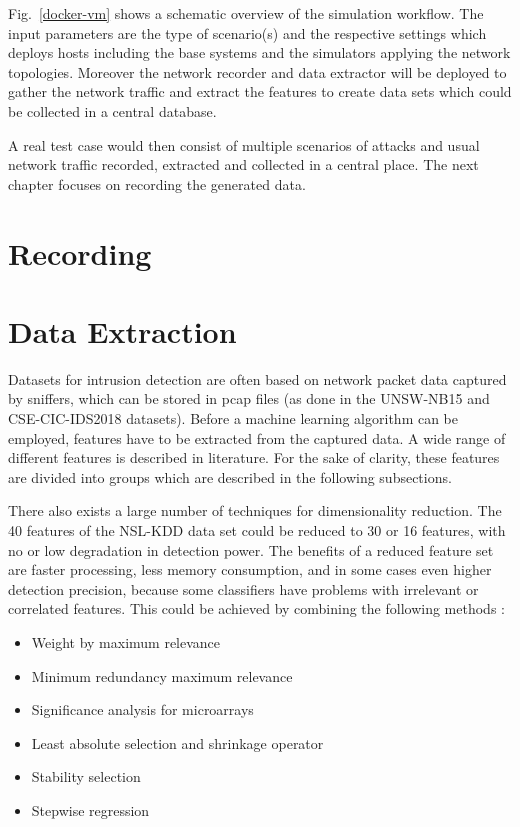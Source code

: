 \documentclass[conference]{IEEEtran}
\begin{document}
Fig.~\ref{docker-vm} shows a schematic overview of the simulation workflow. The input parameters are the type of scenario(s) and the respective settings which deploys hosts including the base systems and the simulators applying the network topologies. Moreover the network recorder and data extractor will be deployed to gather the network traffic and extract the features to create data sets which could be collected in a central database.

A real test case would then consist of multiple scenarios of attacks and usual network traffic recorded, extracted and collected in a central place. The next chapter focuses on recording the generated data.

\section{Recording}

\section{Data Extraction}

Datasets for intrusion detection are often based on network packet data captured by sniffers, which can be stored in pcap files (as done in the UNSW-NB15 \cite{Nb2015} and CSE-CIC-IDS2018 \cite{Ids2018} datasets). Before a machine learning algorithm can be employed, features have to be extracted from the captured data. A wide range of different features is described in literature. For the sake of clarity, these features are divided into groups which are described in the following subsections.

There also exists a large number of techniques for dimensionality reduction. The 40 features of the NSL-KDD data set could be reduced to 30 or 16 features, with no or low degradation in detection power. The benefits of a reduced feature set are faster processing, less memory consumption, and in some cases even higher detection precision, because some classifiers have problems with irrelevant or correlated features. This could be achieved by combining the following methods \cite{vasquez2015}:
\begin{itemize}
	\item Weight by maximum relevance
	\item Minimum redundancy maximum relevance
	\item Significance analysis for microarrays
	\item Least absolute selection and shrinkage operator
	\item Stability selection
	\item Stepwise regression
\end{itemize}
\end{document}
